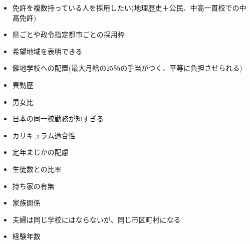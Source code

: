 \documentclass[a4j,10pt]{jsarticle}
\theoremstyle{definition}
\theoremstyle{remark}
\theoremstyle{plain}
\begin{document}
\begin{tcolorbox}[colback=blue!5, colframe=blue!40!black, title=他の制約]
  \begin{itemize}
    \item 免許を複数持っている人を採用したい(地理歴史＋公民、中高一貫校での中高免許)
    \item 県ごとや政令指定都市ごとの採用枠
    \item 希望地域を表明できる
    \item 僻地学校への配置(最大月給の25％の手当がつく、平等に負担させられる)
    \item 異動歴
    \item 男女比
    \item 日本の同一校勤務が短すぎる
    \item カリキュラム適合性
    \item 定年まじかの配慮
    \item 生徒数との比率
    \item 持ち家の有無
    \item 家族関係
    \item 夫婦は同じ学校にはならないが、同じ市区町村になる
    \item 経験年数
  \end{itemize}
\end{tcolorbox}
\end{document}
